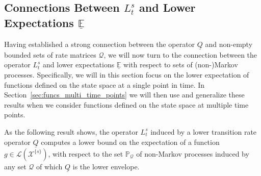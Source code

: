\documentclass[10pt]{paper}
\theoremstyle{definition}
\newcommand{\states}{\mathcal{X}}
\newcommand{\processes}{\mathbb{P}}
\newcommand{\gambles}{\mathcal{L}}
\newcommand{\rateset}{\mathcal{Q}}
\newcommand{\lrate}{\underline{Q}}
\begin{document}


\subsection{Connections Between $L_t^s$ and Lower Expectations $\underline{\mathbb{E}}$}\label{sec:single_var_lower_exp}

Having established a strong connection between the operator $\lrate$ and non-empty bounded sets of rate matrices $\rateset$, we will now turn to the connection between the operator $L_t^s$ and lower expectations $\underline{\mathbb{E}}$ with respect to sets of (non-)Markov processes. Specifically, we will in this section focus on the lower expectation of functions defined on the state space at a single point in time. In Section~\ref{sec:funcs_multi_time_points} we will then use and generalize these results when we consider functions defined on the state space at multiple time points.

As the following result shows, the operator $L_t^s$ induced by a lower transition rate operator $\lrate$ computes a lower bound on the expectation of a function $g\in\gambles(\states^{\{s\}})$, with respect to the set $\processes_\rateset$ of non-Markov processes induced by any set $\rateset$ of which $\lrate$ is the lower envelope.
\end{document}
